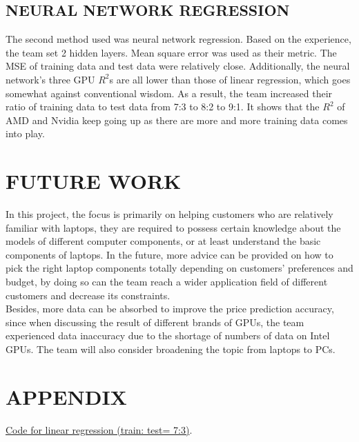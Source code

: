 \documentclass{scrartcl}
\begin{document}
\subsection{NEURAL NETWORK REGRESSION}
The second method used was neural network regression. Based on the experience, the team set 2 hidden layers. Mean square error was used as their metric. The MSE of training data and test data were relatively close. Additionally, the neural network's three GPU $R^2$s are all lower than those of linear regression, which goes somewhat against conventional wisdom. As a result, the team increased their ratio of training data to test data from 7:3 to 8:2 to 9:1. It shows that the $R^2$ of AMD and Nvidia keep going up as there are more and more training data comes into play.\\






\section{FUTURE WORK}

In this project, the focus is primarily on helping customers who are relatively familiar with laptops, they are required to possess certain knowledge about the models of different computer components, or at least understand the basic components of laptops. In the future, more advice can be provided on how to pick the right laptop components totally depending on customers' preferences and budget, by doing so can the team reach a wider application field of different customers and decrease its constraints.\\


\noindent Besides, more data can be absorbed to improve the price prediction accuracy, since when discussing the result of different brands of GPUs, the team experienced data inaccuracy due to the shortage of numbers of data on Intel GPUs. The team will also consider broadening the topic from laptops to PCs.\\


\newpage
\singlespacing




\newpage
\appendix
\section{APPENDIX}

\href{https://github.com/zw2788/MECE4520\_project/blob/main/MECE\_4520\_LaptopPrediction/Method\_Linear.ipynb}{Code for linear regression (train: test= 7:3)}.\\
\end{document}
